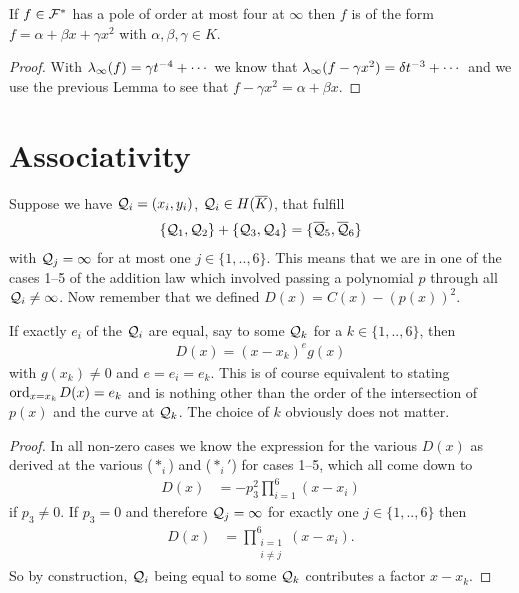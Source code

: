 \documentclass[english,11pt,a4paper]{article}
\begin{document}
\begin{lemma}\label{fourpoles}
  If $f \in \mathcal{F}^*$ has a pole of order at most four at $\infty$ then $f$ is of the form $f = \alpha + \beta x + \gamma x^2$ with $\alpha, \beta, \gamma \in K$.
  \begin{proof}
    With $\lambda_{\infty} (f) = \gamma t^{-4} + \cdots$ we know that $\lambda_{\infty} (f - \gamma x^2) = \delta t^{-3} + \cdots$ and we use the previous Lemma to see that $f - \gamma x^2 = \alpha + \beta x$.
  \end{proof}
\end{lemma}

\newpage

\section{Associativity}

\begin{lemma}\label{mult}
  Suppose we have $\mathcal{Q}_i = (x_i, y_i)$, $\mathcal{Q}_i \in H(\overline K)$, that fulfill
  \begin{align*}
    \{ \mathcal{Q}_1 , \mathcal{Q}_2\}+\{\mathcal{Q}_3 , \mathcal{Q}_4\} = \{\overline {\mathcal{Q}}_5 , \overline {\mathcal{Q}}_6 \}
  \end{align*}
  with $\mathcal{Q}_j = \infty$ for at most one $j \in \{1,..,6\}$. This means that we are in one of the cases 1--5 of the addition law which involved passing a polynomial $p$ through all $\mathcal{Q}_i \neq \infty$. Now remember that we defined $D(x) = C(x) - (p(x))^2$.

  If exactly $e_i$ of the $\mathcal{Q}_i$ are equal, say to some $\mathcal{Q}_k$ for a $k \in \{1,..,6\}$, then
  \begin{align*}
    D(x) = (x-x_k)^e g(x)
  \end{align*}
  with $g(x_k) \neq 0$ and $e = e_i = e_k$. This is of course equivalent to stating $\text{ord}_{x=x_k}\hspace{0.4mm} D(x) = e_k$ and is nothing other than the order of the intersection of $p(x)$ and the curve at $\mathcal{Q}_k$. The choice of $k$ obviously does not matter.
  \begin{proof}
    In all non-zero cases we know the expression for the various $D(x)$ as derived at the various ($*_i$) and ($*_i'$) for cases 1--5, which all come down to
    \begin{align*}
      D(x) &= -p_3^2\prod_{i=1}^6(x-x_i)
    \end{align*}
    if $p_3 \neq 0$. If $p_3 = 0$ and therefore $\mathcal{Q}_j = \infty$ for exactly one $j \in \{1,..,6\}$ then
    \begin{align*}
      D(x) &=  \prod_{\substack{i=1\\i \neq j}}^6(x-x_i).
    \end{align*}
    So by construction, $\mathcal{Q}_i$ being equal to some $\mathcal{Q}_k$ contributes a factor $x-x_k$.
  \end{proof}
\end{lemma}
\end{document}
